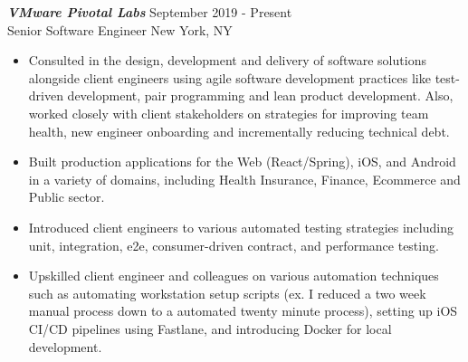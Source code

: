 {\sl \textbf{VMware Pivotal Labs}} \hfill September 2019 - Present \\ Senior Software Engineer \hfill New York, NY
\begin{itemize}
    \item Consulted in the design, development and delivery of software solutions alongside client engineers using agile software development practices like test-driven development, pair programming and lean product development. Also, worked closely with client stakeholders on strategies for improving team health, new engineer onboarding and incrementally reducing technical debt.
    \item Built production applications for the Web (React/Spring), iOS, and Android in a variety of domains, including Health Insurance, Finance, Ecommerce and Public sector.
    \item Introduced client engineers to various automated testing strategies including unit, integration, e2e, consumer-driven contract, and performance testing.
    \item Upskilled client engineer and colleagues on various automation techniques such as automating workstation setup scripts (ex. I reduced a two week manual process down to a automated twenty minute process), setting up iOS CI/CD pipelines using Fastlane, and introducing Docker for local development.
\end{itemize}
